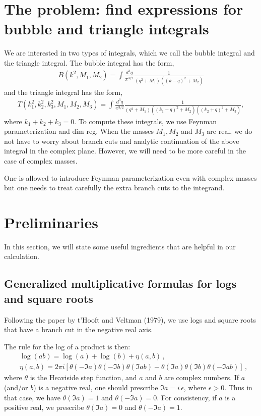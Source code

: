 \documentclass[twoside]{article}
\begin{document}
\section{The problem: find expressions for bubble and triangle integrals}
We are interested in two types of integrals, which we call the bubble integral and the triangle integral. The bubble integral has the form,
\begin{align}
\label{eq:bubble}
B(k^2,M_1,M_2) =  \int \frac{d^3q}{\pi^{3/2}}\frac{1}{(q^2 + M_1)( (k-q)^2 + M_2)}
\end{align}
and the triangle integral has the form,
\begin{align}
T(k_1^2, k_2^2, k_3^2, M_1, M_2, M_3) =  \int \frac{d^3q}{\pi^{3/2}}\frac{1}{(q^2 + M_1)( (k_1-q)^2 + M_2)( (k_2 + q)^2 + M_3)},
\end{align}
where $k_1 + k_2 + k_3 = 0$.
To compute these integrals, we use Feynman parameterization and dim reg. When the masses $M_1,M_2$ and $M_3$ are real, we do not
have to worry about branch cuts and analytic continuation of the above integral in the complex plane. However, we will need to be more
careful in the case of complex masses. 

One is allowed to introduce Feynman parameterization even with complex masses but one needs to treat carefully the extra branch cuts to the integrand.

\section{Preliminaries}
\label{sec:prelim}

In this section, we will state some useful ingredients that are helpful in our calculation.

\subsection{Generalized multiplicative formulas for logs and square roots}

Following the paper by t'Hooft and Veltman (1979), we use logs and square roots that have a branch cut in the negative real axis.

The rule for the log of a product is then:
\begin{equation}
\begin{split}
& \log(a b) = \log(a) + \log(b) + \eta(a,b)\,, \\
& \eta(a,b) = 2 \pi i \left[ \theta(- \Im a) \theta(- \Im b) \theta(\Im ab) - \theta(\Im a) \theta(\Im b) \theta(-\Im ab) \right]\,,
\end{split}
\end{equation}
where $\theta$ is the Heaviside step function, and $a$ and $b$ are complex numbers. If $a$ (and/or $b$) is a negative real, one should prescribe $\Im a = i \, \epsilon$, where $\epsilon>0$. Thus in that case, we have $\theta(\Im a)=1$ and $\theta(-\Im a)=0$. For consistency, if $a$ is a positive real, we prescribe $\theta(\Im a)=0$ and $\theta(-\Im a)=1$.
\end{document}
